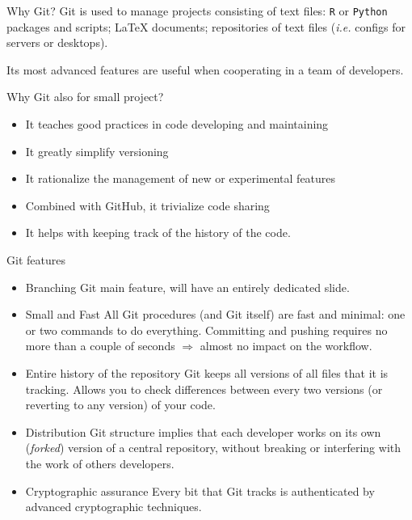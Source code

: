 \documentclass{beamer}
\newcommand{\git}{Git{}}
\newcommand{\cd}[1]{\texttt{#1}}
\begin{document}
\begin{frame}{Why \git?}
    \git{} is used to manage projects consisting of \alert{text files}: \cd{R} or \cd{Python} packages and scripts; \LaTeX{} documents; repositories of text files (\textit{i.e.} configs for servers or desktops).
    
    Its most advanced features are useful when cooperating in a team of developers.
    \begin{block}{Why \git{} also for small project?}
        \begin{itemize}
        \justifying
            \item It teaches \alert{good practices} in code developing and maintaining
            \item It greatly simplify \alert{versioning} 
            \item It rationalize the management of new or experimental features
            \item Combined with GitHub, it trivialize \alert{code sharing}
            \item It helps with keeping track of the \alert{history of the code}.
        \end{itemize}
    \end{block}
\end{frame}

\begin{frame}{\git{} features}
    \begin{itemize}
    \justifying
        \item \alert{Branching} \git{} main feature, will have an entirely dedicated slide.
        \item \alert{Small and Fast} All \git{} procedures (and \git{} itself) are fast and minimal: one or two commands to do everything. Committing and pushing requires no more than a couple of seconds $\Rightarrow$ almost no impact on the workflow.
        \item \alert{Entire history of the repository} \git{} keeps all versions of all files that it is tracking. Allows you to check differences between every two versions (or reverting to any version) of your code.
        \item \alert{Distribution} \git{} structure implies that each developer works on its own (\emph{forked}) version of a central repository, without breaking or interfering with the work of others developers.
        \item \alert{Cryptographic assurance} Every bit that \git{} tracks is authenticated by advanced cryptographic techniques.
    \end{itemize}
\end{frame}
\end{document}
